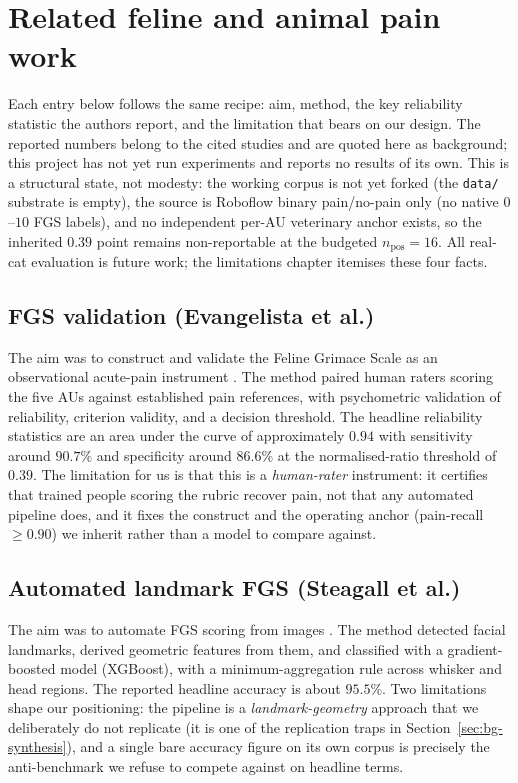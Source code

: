 \section{Related feline and animal pain work}
\label{sec:bg-related}

Each entry below follows the same recipe: aim, method, the key reliability
statistic the authors report, and the limitation that bears on our design. The
reported numbers belong to the cited studies and are quoted here as background;
this project has not yet run experiments and reports no results of its own. This
is a structural state, not modesty: the working corpus is not yet forked (the
\texttt{data/} substrate is empty), the source is Roboflow binary pain/no-pain
only (no native $0$--$10$ FGS labels), and no independent per-AU veterinary
anchor exists, so the inherited $0.39$ point remains non-reportable at the
budgeted $n_{\text{pos}}{=}16$. All real-cat evaluation is future work; the
limitations chapter itemises these four facts.

\subsection{FGS validation (Evangelista et al.)}
The aim was to construct and validate the Feline Grimace Scale as an
observational acute-pain instrument \cite{evangelista2019}. The method paired
human raters scoring the five AUs against established pain references, with
psychometric validation of reliability, criterion validity, and a decision
threshold. The headline reliability statistics are an area under the curve of
approximately $0.94$ with sensitivity around $90.7\%$ and specificity around
$86.6\%$ at the normalised-ratio threshold of $0.39$. The limitation for us is
that this is a \emph{human-rater} instrument: it certifies that trained people
scoring the rubric recover pain, not that any automated pipeline does, and it
fixes the construct and the operating anchor (pain-recall $\geq 0.90$) we
inherit rather than a model to compare against.

\subsection{Automated landmark FGS (Steagall et al.)}
The aim was to automate FGS scoring from images \cite{steagall2023}. The method
detected facial landmarks, derived geometric features from them, and classified
with a gradient-boosted model (XGBoost), with a minimum-aggregation rule across
whisker and head regions. The reported headline accuracy is about $95.5\%$. Two
limitations shape our positioning: the pipeline is a \emph{landmark-geometry}
approach that we deliberately do not replicate (it is one of the replication
traps in Section~\ref{sec:bg-synthesis}), and a single bare accuracy figure on
its own corpus is precisely the anti-benchmark we refuse to compete against on
headline terms.

